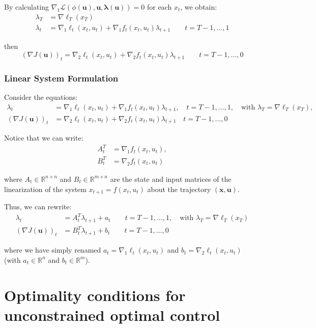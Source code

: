 \documentclass[openany]{book}
\theoremstyle{definition}
\theoremstyle{remark}
\begin{document}
By calculating $\nabla_1\mathcal{L}(\phi(\mathbf{u}), \mathbf{u}, \boldsymbol{\lambda}(\mathbf{u})) = 0$ for each $x_t$, we obtain:
\begin{align*}
\lambda_T &= \nabla\ell_T(x_T) \\
\lambda_t &= \nabla_1\ell_t(x_t, u_t) + \nabla_1f_t(x_t, u_t)\lambda_{t+1} \qquad t = T-1,\ldots,1
\end{align*}

then
\[
(\nabla J(\mathbf{u}))_t = \nabla_2\ell_t(x_t, u_t) + \nabla_2f_t(x_t, u_t)\lambda_{t+1} \qquad t = T-1,\ldots,0
\]

\subsubsection{Linear System Formulation}

Consider the equations:
\begin{align*}
\lambda_t &= \nabla_1\ell_t(x_t, u_t) + \nabla_1f_t(x_t, u_t)\lambda_{t+1}, \quad t = T-1,\ldots,1, \quad \text{with } \lambda_T = \nabla\ell_T(x_T),\\
(\nabla J(\mathbf{u}))_t &= \nabla_2\ell_t(x_t, u_t) + \nabla_2f_t(x_t, u_t)\lambda_{t+1} \quad t = T-1,\ldots,0
\end{align*}

Notice that we can write:
\begin{align*}
A_t^T &= \nabla_1f_t(x_t, u_t),\\
B_t^T &= \nabla_2f_t(x_t, u_t)
\end{align*}

where $A_t \in \mathbb{R}^{n\times n}$ and $B_t \in \mathbb{R}^{m\times n}$ are the state and input matrices of the linearization of the system $x_{t+1} = f(x_t, u_t)$ about the trajectory $(\mathbf{x}, \mathbf{u})$.

Thus, we can rewrite:
\begin{align*}
\lambda_t &= A_t^T\lambda_{t+1} + a_t \qquad t = T-1,\ldots,1, \quad \text{with } \lambda_T = \nabla\ell_T(x_T)\\
(\nabla J(\mathbf{u}))_t &= B_t^T\lambda_{t+1} + b_t \qquad t = T-1,\ldots,0
\end{align*}

where we have simply renamed $a_t = \nabla_1\ell_t(x_t, u_t)$ and $b_t = \nabla_2\ell_t(x_t, u_t)$ (with $a_t \in \mathbb{R}^n$ and $b_t \in \mathbb{R}^m$).

\section{Optimality conditions for unconstrained optimal control}
\end{document}
